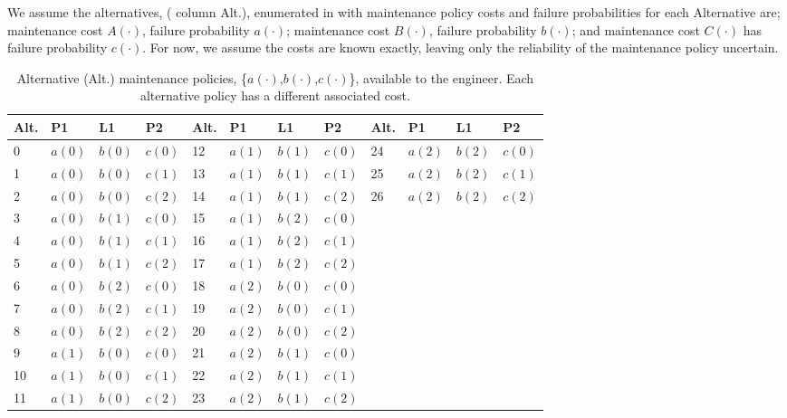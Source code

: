 \documentclass[review]{elsarticle}
\begin{document}
	We assume the alternatives, ( column Alt.), enumerated in  with 
	maintenance policy costs and failure probabilities for each Alternative are; maintenance cost $A(\cdot)$,  
	failure probability $a(\cdot)$; maintenance cost $B(\cdot)$, failure probability $b(\cdot)$; and maintenance cost $C(\cdot)$
	has failure probability $c(\cdot)$.
	For now, we assume the costs are known exactly, leaving only the reliability of the maintenance policy uncertain.
				
	\begin{table}[ht]
	\caption{Alternative (Alt.) maintenance policies, \{$a(\cdot)$,$b(\cdot)$,$c(\cdot)$\}, available to the engineer. 
	Each alternative policy has a different associated cost.}
	\centering
	\begin{tabular}{l lll | l lll | l lll} \\
	\toprule
	Alt. & P1		&	L1		&	P2		& Alt. & P1		&	L1		&	P2		
	& Alt. &  P1		&	L1		&	P2		\\ \midrule
		
	0 &		$a(0)$		&	$b(0)$		&	$c(0)$			&	12 &		$a(1)$	&	$b(1)$	&	$c(0)$		
	&	24 &	$a(2)$	&	$b(2)$	&	$c(0)$	 \\

	1 &		$a(0)$		&	$b(0)$		&	$c(1)$		&	13 &		$a(1)$	&	$b(1)$	&	$c(1)$	
	&	25 &		$a(2)$	&	$b(2)$	&	$c(1)$ \\

	2 &		$a(0)$		&	$b(0)$		&	$c(2)$		&	14 &		$a(1)$	&	$b(1)$	&	$c(2)$	
	&	26 &		$a(2)$	&	$b(2)$	&	$c(2)$ \\
		
	3 &		$a(0)$		&	$b(1)$	&	$c(0)$			&	15 &		$a(1)$	&	$b(2)$	&	$c(0)$		& & & \\
	4 &		$a(0)$		&	$b(1)$	&	$c(1)$		&	16 &		$a(1)$	&	$b(2)$	&	$c(1)$	& & & \\

	5 &		$a(0)$		&	$b(1)$	&	$c(2)$		&	17 &		$a(1)$	&	$b(2)$	&	$c(2)$	& & & \\

	6 &		$a(0)$		&	$b(2)$	&	$c(0)$			&	18 &		$a(2)$	&	$b(0)$		&	$c(0)$		& & & \\

	7 &		$a(0)$		&	$b(2)$	&	$c(1)$		&	19 &		$a(2)$	&	$b(0)$		&	$c(1)$	& & & \\

	8 &		$a(0)$		&	$b(2)$	&	$c(2)$		&	20 &		$a(2)$	&	$b(0)$		&	$c(2)$	& & & \\

	9 &		$a(1)$	&	$b(0)$		&	$c(0)$		&	21 &		$a(2)$	&	$b(1)$	&	$c(0)$		& & & \\
		
	10 &		$a(1)$	&	$b(0)$		&	$c(1)$	&	22 &		$a(2)$	&	$b(1)$	&	$c(1)$	& & & \\

	11 &		$a(1)$	&	$b(0)$		&	$c(2)$	&	23 &		$a(2)$	&	$b(1)$	&	$c(2)$	& & & \\ \bottomrule
	\end{tabular}
	\label{tab:alternatives}
	\end{table}%
\end{document}
